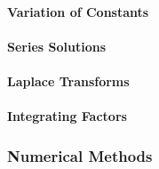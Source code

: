 


\paragraph{Variation of Constants}


\paragraph{Series Solutions}

\paragraph{Laplace Transforms}

\paragraph{Integrating Factors}














\subsubsection{Numerical Methods}

